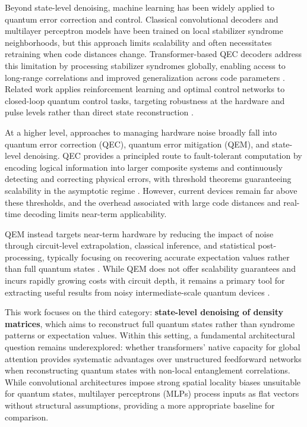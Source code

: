 \documentclass[11pt]{article}
\begin{document}
Beyond state-level denoising, machine learning has been widely applied to quantum error correction and control. Classical convolutional decoders \citep{breuckmann_scalable_2018} and multilayer perceptron models \citep{chamberland_deep_2018} have been trained on local stabilizer syndrome neighborhoods, but this approach limits scalability and often necessitates retraining when code distances change. Transformer-based QEC decoders address this limitation by processing stabilizer syndromes globally, enabling access to long-range correlations and improved generalization across code parameters \citep{wang2023transformerqecquantumerrorcorrection}. Related work applies reinforcement learning and optimal control networks to closed-loop quantum control tasks, targeting robustness at the hardware and pulse levels rather than direct state reconstruction \citep{Ma_2025}.

At a higher level, approaches to managing hardware noise broadly fall into quantum error correction (QEC), quantum error mitigation (QEM), and state-level denoising. QEC provides a principled route to fault-tolerant computation by encoding logical information into larger composite systems and continuously detecting and correcting physical errors, with threshold theorems guaranteeing scalability in the asymptotic regime \citep{Bravyi_2024,202509.2149}. However, current devices remain far above these thresholds, and the overhead associated with large code distances and real-time decoding limits near-term applicability.

QEM instead targets near-term hardware by reducing the impact of noise through circuit-level extrapolation, classical inference, and statistical post-processing, typically focusing on recovering accurate expectation values rather than full quantum states \citep{RevModPhys.95.045005,Bultrini_2023}. While QEM does not offer scalability guarantees and incurs rapidly growing costs with circuit depth, it remains a primary tool for extracting useful results from noisy intermediate-scale quantum devices \citep{filippov2024scalabilityquantumerrormitigation}.

This work focuses on the third category: \textbf{state-level denoising of density matrices}, which aims to reconstruct full quantum states rather than syndrome patterns or expectation values. Within this setting, a fundamental architectural question remains underexplored: whether transformers' native capacity for global attention provides systematic advantages over unstructured feedforward networks when reconstructing quantum states with non-local entanglement correlations. While convolutional architectures impose strong spatial locality biases unsuitable for quantum states, multilayer perceptrons (MLPs) process inputs as flat vectors without structural assumptions, providing a more appropriate baseline for comparison.
\end{document}
